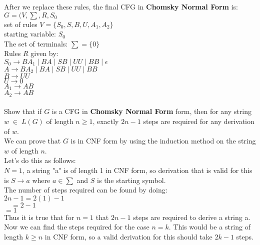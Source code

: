 \documentclass[12pt]{article}
\begin{document}
After we replace these rules, the final CFG in \textbf{Chomsky Normal Form} is: \\
$G = (V, \sum, R, S_0$ \\
set of rules $V = \{S_0, S, B, U, A_1, A_2 \}$ \\
starting variable: $S_0$ \\
The set of terminals: $\sum = \{ 0 \}$ \\
Rules $R$ given by: \\
$S_0 \rightarrow BA_1 \; | \; BA \; | \; SB \; | \; UU \; | \; BB \; | \; \epsilon$ \\
$A \rightarrow BA_2 \; | \; BA \; | \; SB \; | \; UU \; | \; BB $ \\
$B \rightarrow UU $ \\
$U \rightarrow 0$ \\
$A_1 \rightarrow AB$ \\
$A_2 \rightarrow AB$ \\

\pagebreak
{} \\
Show that if $G$ is a CFG in \textbf{Chomsky Normal Form} form, then for any string $w \; \in \; L(G)$
of length $n \geq 1$, exactly $2n - 1$ steps are required for any derivation of $w$. \\

We can prove that $G$ is in CNF form by using the induction method on the string $w$ of length $n$. \\

Let's do this as follows: \\
$N = 1$, a string "a" is of length 1 in CNF form, so derivation that is valid for this is
$S \rightarrow a$ where $a \in \sum$ and $S$ is the starting symbol. \\

The number of steps required can be found by doing: \\
$2n - 1 = 2(1) - 1$ \\
$ \quad = 2 - 1 $ \\
$       = 1 $ \\
Thus it is true that for $n = 1$ that $2n - 1$ steps are required to derive a string a. \\

Now we can find the steps required for the case $n = k$. This would be a string of length
$k \geq n$ in CNF form, so a valid derivation for this should take $2k - 1$ steps. \\
\end{document}
